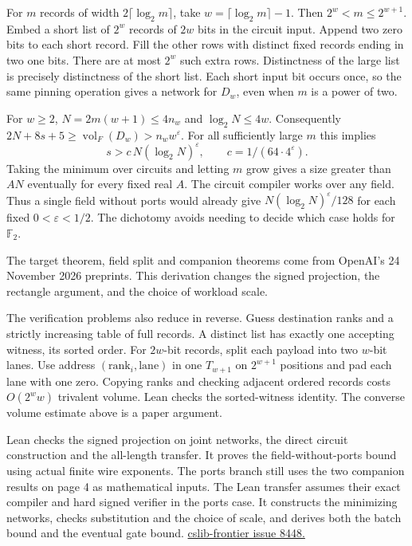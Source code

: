 \documentclass[11pt,letterpaper]{article}
\newcommand{\subhead}[1]{\par\smallskip{\noindent\large\bfseries #1\par}\vspace{-2pt}}
\newcommand{\vol}{\operatorname{vol}}
\newcommand{\ED}{D}
\newcommand{\Tag}{T}
\begin{document}
For \(m\) records of width \(2\lceil\log_2 m\rceil\), take
\(w=\lceil\log_2m\rceil-1\). Then \(2^w<m\le 2^{w+1}\). Embed a short
list of \(2^w\) records of \(2w\) bits in the circuit input. Append two zero
bits to each short record. Fill the other rows with distinct fixed records
ending in two one bits. There are at most \(2^w\) such extra rows.
Distinctness of the large list is precisely distinctness of the short list.
Each short input bit occurs once, so the same pinning operation gives a
network for \(\ED_w\), even when \(m\) is a power of two.

For \(w\ge2\), \(N=2m(w+1)\le4n_w\) and \(\log_2 N\le4w\).
Consequently \(2N+8s+5\ge\vol_F(\ED_w)>n_w w^\varepsilon\).
For all sufficiently large \(m\) this implies
\[
           s>c\,N(\log_2 N)^\varepsilon,\qquad
           c=1/(64\cdot4^\varepsilon).
\]
Taking the minimum over circuits and letting \(m\) grow gives a size greater
than \(AN\) eventually for every fixed real \(A\). The circuit compiler works
over any field. Thus a single field without ports would already give
\(N(\log_2 N)^\varepsilon/128\) for each fixed \(0<\varepsilon<1/2\).
The dichotomy avoids needing to decide which case holds for \(\mathbb F_2\).

\subhead{Provenance and formal status}
The target theorem, field split and companion theorems come from OpenAI's
24 November 2026 preprints. This derivation changes the signed projection,
the rectangle argument, and the choice of workload scale.

The verification problems also reduce in reverse. Guess destination ranks
and a strictly increasing table of full records. A distinct list has exactly
one accepting witness, its sorted order. For \(2w\)-bit records, split each
payload into two \(w\)-bit lanes. Use address \((\mathrm{rank}_i,\mathrm{lane})\)
in one \(\Tag_{w+1}\) on \(2^{w+1}\) positions and pad each lane with one
zero. Copying ranks and checking adjacent ordered records costs
\(O(2^w w)\) trivalent volume. Lean checks the sorted-witness identity.
The converse volume estimate above is a paper argument.

Lean checks the signed projection on joint networks, the direct circuit
construction and the all-length transfer. It proves the field-without-ports
bound using actual finite wire exponents. The ports branch still uses the
two companion results on page 4 as mathematical inputs. The Lean transfer
assumes their exact compiler and hard signed verifier in the ports case. It
constructs the minimizing networks, checks substitution and the choice of
scale, and derives both the batch bound and the eventual gate bound.
\href{https://github.com/cslib-community/cslib-frontier/issues/8448}{cslib-frontier issue 8448.}
\end{document}
